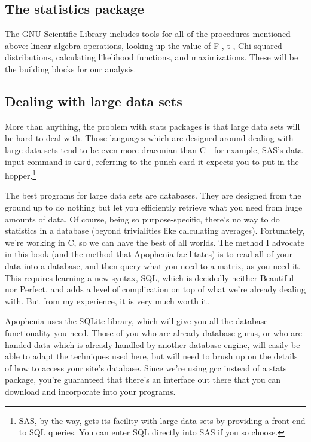 \documentclass[12pt,notitlepage, openany]{book}
\begin{document}
\subsection{The statistics package} The GNU Scientific Library includes tools for
all of the procedures mentioned above: linear algebra operations, looking up the
value of F-, t-, Chi-squared distributions, calculating likelihood functions, and
maximizations. These will be the building blocks for our analysis.

\subsection{Dealing with large data sets} More than anything, the problem
with stats packages is that large data sets will be hard to deal
with. Those languages which are designed around dealing with large data
sets tend to be even more draconian than C---for example, SAS's data
input command is {\tt card}, referring to the punch card it expects you
to put in the hopper.\footnote{SAS, by the way, gets its facility with large data sets
by providing a front-end to SQL queries. You can enter SQL directly into
SAS if you so choose.}

The best programs for large data sets are databases. They are designed
from the ground up to do nothing but let you efficiently retrieve what you
need from huge amounts of data.  Of course, being so purpose-specific,
there's no way to do statistics in a database (beyond trivialities like calculating
averages). Fortunately, we're working in C, so we can have the best of
all worlds. The method I advocate in this book (and the method that
Apophenia facilitates) is to read all of your
data into a database, and then query what you need to a matrix, as you
need it. This requires learning a new syntax, SQL, which is decidedly
neither Beautiful nor Perfect, and adds a level of complication on top
of what we're already dealing with. But from my experience, it is very
much worth it.

Apophenia  uses the SQLite library, which will
give you all the database functionality you need. Those of you who are
already database gurus, or who are handed data which is already handled
by another database engine, will easily be able to adapt the techniques
used here, but will need to brush up on the details of how to access
your site's database. Since we're using gcc instead of a stats package,
you're guaranteed that there's an interface out there that you can
download and incorporate into your programs.
\end{document}
